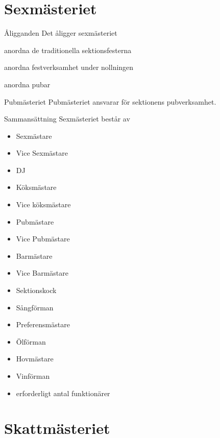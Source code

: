 \documentclass[pdfbookmarks,a4paper,11pt]{article}
\newlength{\itemcollength}
\newenvironment{reglemlista}{%
  \begin{list}{}{%
      \setlength{\labelwidth}{\itemcollength}%
      \setlength{\leftmargin}{\labelwidth + \labelsep}%
      \renewcommand{\makelabel}[1]{%
        \raisebox{0pt}[1ex][0pt]{%
          \makebox[\labelwidth][l]{%
            \parbox[t]{\itemcollength}{%
              \raggedright\hspace{0pt}##1}}}\hfill}%
      }}{%
  \end{list}}
\begin{document}
\section{Sexmästeriet}

\begin{reglemlista}

	\item[Åligganden]
	Det åligger sexmästeriet
	\begin{attlista}
		\item anordna de traditionella sektionsfesterna
		\item anordna festverksamhet under nollningen
		\item anordna pubar
	\end{attlista}

	\item[Pubmästeriet]
	Pubmästeriet ansvarar för sektionens pubverksamhet.

	\item[Sammansättning]
	Sexmästeriet består av
	\begin{itemize}
		\item Sexmästare
		\item Vice Sexmästare
		\item DJ
		\item Köksmästare
		\item Vice köksmästare
		\item Pubmästare
		\item Vice Pubmästare
		\item Barmästare
		\item Vice Barmästare
		\item Sektionskock
		\item Sångförman
		\item Preferensmästare
		\item Ölförman
		\item Hovmästare
		\item Vinförman
		\item erforderligt antal funktionärer
	\end{itemize}
\end{reglemlista}

\section{Skattmästeriet}
\end{document}
